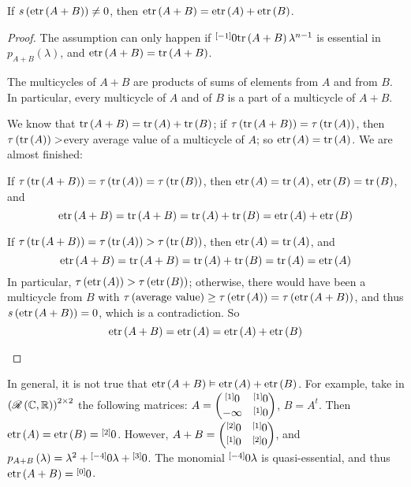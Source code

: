 \begin{lem}
If $s\left(\etr\left(A+B\right)\right)\neq0$, then $\etr\left(A+B\right)=\etr\left(A\right)+\etr\left(B\right)$.
\end{lem}
\begin{proof}
The assumption can only happen if $\minus\tr\left(A+B\right)\lambda^{n-1}$ is essential in $p_{A+B}\left(\lambda\right)$, and $\etr\left(A+B\right)=\tr\left(A+B\right)$.

The multicycles of $A+B$ are products of sums of elements from $A$ and from $B$. In particular, every multicycle of $A$ and of $B$ is a part of a multicycle of $A+B$.

We know that $\tr\left(A+B\right)=\tr\left(A\right)+\tr\left(B\right)$; if $\t\left(\tr\left(A+B\right)\right)=\t\left(\tr\left(A\right)\right)$, then $\t\left(\tr\left(A\right)\right)>$every average value of a multicycle of $A$; so $\etr\left(A\right)=\tr\left(A\right)$. We are almost finished:
\begin{casenv}
\item If $\t\left(\tr\left(A+B\right)\right)=\t\left(\tr\left(A\right)\right)=\t\left(\tr\left(B\right)\right)$, then $\etr\left(A\right)=\tr\left(A\right)$, $\etr\left(B\right)=\tr\left(B\right)$, and $$\etr\left(A+B\right)=\tr\left(A+B\right)=\tr\left(A\right)+\tr\left(B\right)=\etr\left(A\right)+\etr\left(B\right)$$

\item If $\t\left(\tr\left(A+B\right)\right)=\t\left(\tr\left(A\right)\right)>\t\left(\tr\left(B\right)\right)$, then $\etr\left(A\right)=\tr\left(A\right)$, and $$\etr\left(A+B\right)=\tr\left(A+B\right)=\tr\left(A\right)+\tr\left(B\right)=\tr\left(A\right)=\etr\left(A\right)$$
    In particular, $\t\left(\etr\left(A\right)\right)>\t\left(\etr\left(B\right)\right)$; otherwise, there would have been a multicycle from $B$ with $\t\left(\textnormal{average value}\right)\ge\t\left(\etr\left(A\right)\right)=\t\left(\etr\left(A+B\right)\right)$, and thus $s\left(\etr\left(A+B\right)\right)=0$, which is a contradiction. So
    $$\etr\left(A+B\right)=\etr\left(A\right)=\etr\left(A\right)+\etr\left(B\right)$$
\end{casenv}
\end{proof}

\begin{example}
In general, it is not true that $\etr\left(A+B\right)\vDash\etr\left(A\right)+\etr\left(B\right)$. For example, take in $\left(\ELT{\mathbb{R}}{\mathbb{C}}\right)^{2\times 2}$ the following matrices: $A=\left(\begin{matrix}\layer{0}{1}&\layer{0}{1}\\-\infty&\layer{0}{1}\end{matrix}\right)$, $B=A^t$. Then $\etr\left(A\right)=\etr\left(B\right)=\layer{0}{2}$. However, $A+B=\left(\begin{matrix}\layer{0}{2}&\layer{0}{1}\\\layer{0}{1}&\layer{0}{2}\end{matrix}\right)$, and $p_{A+B}\left(\lambda\right)=\lambda^2+\layer{0}{-4}\lambda+\layer{0}{3}$. The monomial $\layer{0}{-4}\lambda$ is quasi-essential, and thus $\etr\left(A+B\right)=\layer{0}{0}$.
\end{example}

